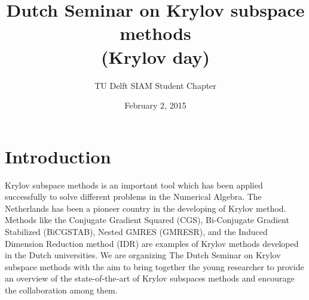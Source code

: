 \documentclass{article}
\title{Dutch Seminar on Krylov subspace methods \\(Krylov day)}
\author{TU Delft SIAM Student Chapter}
\date{February 2, 2015}
\begin{document}
\maketitle
\section{Introduction}
Krylov subspace methods is an important tool which has been applied successfully to solve different problems 
in the Numerical Algebra. The Netherlands has been a pioneer country in the developing of Krylov method.
Methods like the Conjugate Gradient Squared (CGS), Bi-Conjugate Gradient Stabilized (BiCGSTAB), Nested GMRES (GMRESR), and the Induced Dimension Reduction method (IDR)  
are examples of Krylov methods developed in the Dutch universities. 
We are organizing The Dutch Seminar on Krylov subspace methods with the aim 
to bring together the young researcher to provide an
overview of the state-of-the-art of Krylov subspaces methods and encourage 
the collaboration among them.
\newpage
\end{document}
